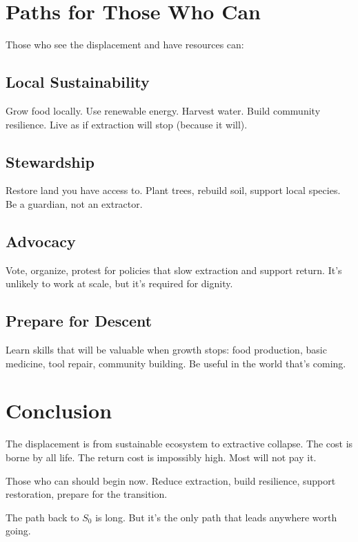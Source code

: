 \documentclass[12pt]{article}
\begin{document}
\section{Paths for Those Who Can}

Those who see the displacement and have resources can:

\subsection{Local Sustainability}

Grow food locally. Use renewable energy. Harvest water. Build community resilience. Live as if extraction will stop (because it will).

\subsection{Stewardship}

Restore land you have access to. Plant trees, rebuild soil, support local species. Be a guardian, not an extractor.

\subsection{Advocacy}

Vote, organize, protest for policies that slow extraction and support return. It's unlikely to work at scale, but it's required for dignity.

\subsection{Prepare for Descent}

Learn skills that will be valuable when growth stops: food production, basic medicine, tool repair, community building. Be useful in the world that's coming.

\section{Conclusion}

The displacement is from sustainable ecosystem to extractive collapse. The cost is borne by all life. The return cost is impossibly high. Most will not pay it.

Those who can should begin now. Reduce extraction, build resilience, support restoration, prepare for the transition.

The path back to $S_0$ is long. But it's the only path that leads anywhere worth going.
\end{document}
